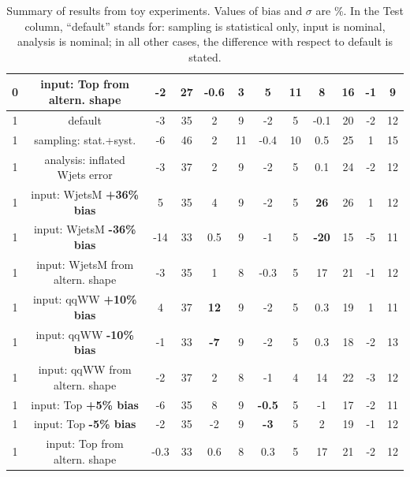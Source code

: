 \begin{table}
\begin{center}
\begin{tabular}{c | c  | c c | c c | c c | c c | c c }
0 & input: Top from altern. shape       & -2  & 27  & -0.6 & 3 & 5        & 11  & 8    & 16  & -1   & 9\\
\hline
\hline
1 & default                             & -3  & 35 & 2   & 9  & -2  & 5 & -0.1 & 20 &-2 & 12 \\
1 & sampling: stat.+syst.               & -6  & 46 & 2   & 11 &-0.4 & 10& 0.5  & 25 & 1 & 15 \\
\hline
1 & analysis: inflated Wjets error      &  -3 &  37 & 2  & 9 & -2   & 5  & 0.1      & 24  & -2  & 12 \\ 
1 & input: WjetsM {\bf +36\% bias}      &  5  &  35 & 4  & 9 & -2   & 5  & {\bf 26} & 26  & 1   & 12 \\ 
1 & input: WjetsM {\bf -36\% bias}      & -14 &  33 & 0.5& 9 & -1   & 5  & {\bf-20} & 15  & -5  & 11 \\ 
1 & input: WjetsM from altern. shape    &  -3 &  35 & 1  & 8 & -0.3 & 5  & 17       & 21  & -1  & 12 \\
\hline
1 & input: qqWW {\bf +10\% bias}        & 4   & 37 & {\bf 12} & 9 & -2  & 5  & 0.3  & 19 & 1  & 11 \\
1 & input: qqWW {\bf -10\% bias}        & -1  & 33 & {\bf -7} & 9 & -2  & 5  & 0.3  & 18 & -2 & 13 \\
1 & input: qqWW from altern. shape      & -2  & 37 & 2        & 8 & -1  & 4  & 14   & 22 & -3 & 12 \\
\hline
1 & input: Top {\bf +5\% bias}          & -6   & 35  & 8   & 9 & {\bf -0.5} & 5 & -1 & 17 & -2 & 11 \\
1 & input: Top {\bf -5\% bias}          & -2   & 35  & -2  & 9 & {\bf -3}   & 5 & 2  & 19 & -1 & 12 \\
1 & input: Top from altern. shape       & -0.3 & 33  & 0.6 & 8 & 0.3        & 5 & 17 & 21 & -2 & 12 \\
\hline
\hline
\end{tabular}
\caption{Summary of results from toy experiments. Values of bias and $\sigma$ are \%.
In the Test column, ``default'' stands for: sampling is statistical only, input is nominal, analysis is nominal; 
in all other cases, the difference with respect to default is stated.}
\label{tab:toy_summary}
\end{center}
\end{table}


